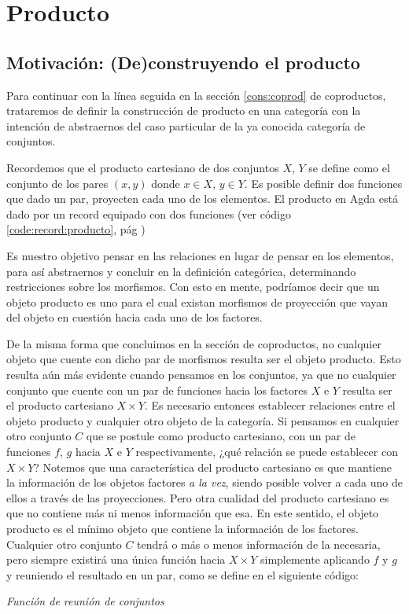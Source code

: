 \section{Producto}\label{cons:prod}

\subsection{Motivación: (De)construyendo el producto}
\label{cons:prod:motivacion}
Para continuar con la línea seguida en la sección \ref{cons:coprod} de coproductos, trataremos de definir la construcción de producto en una categoría con la intención de abstraernos del caso particular de la ya conocida categoría de conjuntos.

Recordemos que el producto cartesiano de dos conjuntos $X$, $Y$ se define como el conjunto de los pares $(x,y)$ donde $x \in X$, $y \in Y$. Es posible definir dos funciones que dado un par, proyecten cada uno de los elementos. El producto en Agda está dado por un record equipado con dos funciones (ver código \ref{code:record:producto}, pág \pageref{code:record:producto})

Es nuestro objetivo pensar en las relaciones en lugar de pensar en los elementos, para así abstraernos y concluir en la definición categórica, determinando restricciones sobre los morfismos. Con esto en mente, podríamos decir que un objeto producto es uno para el cual existan morfismos de proyección que vayan del objeto en cuestión hacia cada uno de los factores.

De la misma forma que concluimos en la sección de coproductos, no cualquier objeto que cuente con dicho par de morfismos resulta ser el objeto producto. Esto resulta aún más evidente cuando pensamos en los conjuntos, ya que no cualquier conjunto que cuente con un par de funciones hacia los factores $X$ e $Y$ resulta ser el producto cartesiano $X \times Y$. Es necesario entonces establecer relaciones entre el objeto producto y cualquier otro objeto de la categoría.
Si pensamos en cualquier otro conjunto $C$ que se postule como producto cartesiano, con un par de funciones $f$, $g$ hacia $X$ e $Y$ respectivamente, ¿qué relación se puede establecer con $X\times Y$?
Notemos que una característica del producto cartesiano es que mantiene la información de los objetos factores {\it a la vez}, siendo posible volver a cada uno de ellos a través de las proyecciones. Pero otra cualidad del producto cartesiano es que no contiene más ni menos información que esa. 
En este sentido, el objeto producto es el mínimo objeto que contiene la información de los factores.\\
Cualquier otro conjunto $C$ tendrá o más o menos información de la necesaria, pero siempre existirá una única función hacia $X \times Y$ simplemente aplicando $f$ y $g$ y reuniendo el resultado en un par, como se define en el siguiente código:
\begin{agdacode}{\it Función de reunión de conjuntos}

\end{agdacode}

